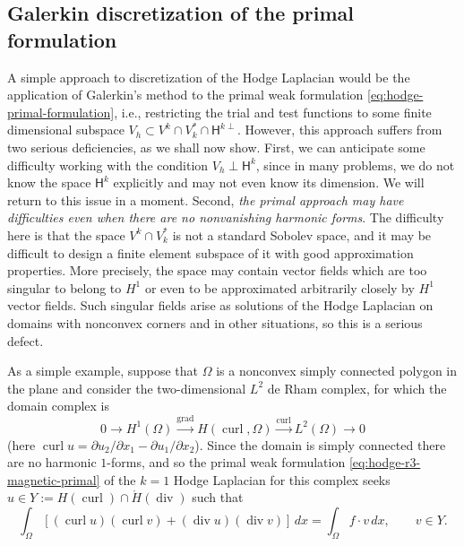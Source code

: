 \subsection{{Galerkin discretization of the primal formulation}}\label{sec:primal-galerkin}

{A simple approach to discretization of the Hodge Laplacian would be the application of Galerkin's method to the primal weak formulation \eqref{eq:hodge-primal-formulation}, i.e., restricting the trial and test functions to some finite dimensional subspace $V_h\subset V^k\cap V_k^*\cap\mathsf H^{k\perp}$. However, this approach suffers from two serious deficiencies, as we shall now show. First, we can anticipate some difficulty working with the condition $V_h\perp\mathsf H^k$, since in many problems, we do not know the space $\mathsf H^k$ explicitly and may not even know its dimension. We will return to this issue in a moment. Second, \emph{the primal approach may have difficulties even when there are no nonvanishing harmonic forms}. The difficulty here is that the space $V^k\cap V_k^*$ is not a standard Sobolev space, and it may be difficult to design a finite element subspace of it with good approximation properties. More precisely, the space may contain vector fields which are too singular to belong to $H^1$ or even to be approximated arbitrarily closely by $H^1$ vector fields. Such singular fields arise as solutions of the Hodge Laplacian on domains with nonconvex corners and in other situations, so this is a serious defect.}

{As a simple example, suppose that $\Omega$ is a nonconvex simply connected polygon in the plane and consider the two-dimensional $L^2$ de Rham complex, for which the domain complex is}
\[
0\to H^1(\Omega)\xrightarrow{\operatorname{grad}}H(\operatorname{curl},\Omega)\xrightarrow{\operatorname{curl}}L^2(\Omega)\to0
\]
{(here $\operatorname{curl}u=\partial u_2/\partial x_1-\partial u_1/\partial x_2$). Since the domain is simply connected there are no harmonic $1$-forms, and so the primal weak formulation \eqref{eq:hodge-r3-magnetic-primal} of the $k=1$ Hodge Laplacian for this complex seeks $u\in Y:=H(\operatorname{curl})\cap\mathring H(\operatorname{div})$ such that}
\begin{equation}\label{eq:primal-galerkin-polygon}
\int_\Omega[(\operatorname{curl}u)(\operatorname{curl}v)+(\operatorname{div}u)(\operatorname{div}v)]\,dx=\int_\Omega f\cdot v\,dx,\qquad v\in Y.
\end{equation}

